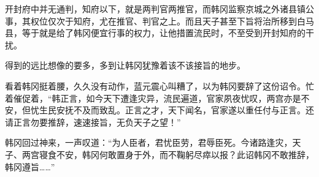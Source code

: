 开封府中并无通判，知府以下，就是两判官两推官，而韩冈监察京城之外诸县镇公事，其权位仅次于知府，尤在推官、判官之上。而且天子甚至下旨将治所移到白马县，等于就是给了韩冈便宜行事的权力，让他措置流民时，不至受到开封知府的干扰。

得到的远比想像的要多，多到让韩冈犹豫着该不该接旨的地步。

看着韩冈挺着腰，久久没有动作，蓝元震心叫糟了，以为韩冈要辞了这份诏令。忙着催促着，“韩正言，如今天下遭逢灾异，流民遍道，官家夙夜忧叹，两宫亦是不安，但忧生民安抚不及而致乱。正言之才，天下闻名，官家遂以重任付与正言。还请正言勿要推辞，速速接旨，无负天子之望！”

韩冈回过神来，一声叹道：“为人臣者，君忧臣劳，君辱臣死。今诸路逢灾，天子、两宫寝食不安，韩冈何敢置身于外，而不鞠躬尽瘁以报？此诏韩冈不敢推辞，韩冈遵旨……”

